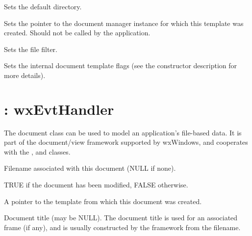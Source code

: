 Sets the default directory.



Sets the pointer to the document manager instance for which this template was created.
Should not be called by the application.



Sets the file filter.



Sets the internal document template flags (see the constructor description for more details).

\section{: wxEvtHandler}\label{wxdocument}


The document class can be used to model an application's file-based
data. It is part of the document/view framework supported by wxWindows,
and cooperates with the , \rtfsp
and  classes.



Filename associated with this document (NULL if none).



TRUE if the document has been modified, FALSE otherwise.



A pointer to the template from which this document was created.



Document title (may be NULL). The document title is used for an associated
frame (if any), and is usually constructed by the framework from
the filename.

